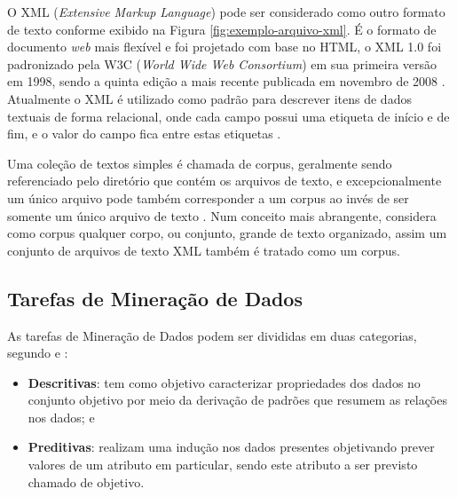         O XML (\textit{Extensive Markup Language}) pode ser considerado como outro formato de texto conforme exibido na Figura \ref{fig:exemplo-arquivo-xml}. 
        É o formato de documento \textit{web} mais flexível e foi projetado com base no HTML, o XML 1.0 foi padronizado pela W3C (\textit{World Wide Web Consortium}) em sua primeira versão em 1998, sendo a quinta edição a mais recente publicada em novembro de 2008 \cite{XML10_5ed_2008}.
        Atualmente o XML é utilizado como padrão para descrever itens de dados textuais de forma relacional, onde cada campo possui uma etiqueta de início e de fim, e o valor do campo fica entre estas etiquetas \cite[p.~6]{Jo2018TMCIBDC}.
        
        
        
        Uma coleção de textos simples é chamada de corpus, geralmente sendo referenciado pelo diretório que contém os arquivos de texto, e excepcionalmente um único arquivo pode também corresponder a um corpus ao invés de ser somente um único arquivo de texto \cite[p.~6]{Jo2018TMCIBDC}.
        Num conceito mais abrangente,  considera como corpus qualquer corpo, ou conjunto, grande de texto organizado, assim um conjunto de arquivos de texto XML também é tratado como um corpus.
    
    \subsection{Tarefas de Mineração de Dados} \label{subsec:Tarefas-de-Mineração-de-Dados}
        As tarefas de Mineração de Dados podem ser divididas em duas categorias, segundo  e : 
        \begin{itemize}
            \item \textbf{Descritivas}: tem como objetivo caracterizar propriedades dos dados no conjunto objetivo por meio da derivação de padrões que resumem as relações nos dados; e
            
            \item \textbf{Preditivas}: realizam uma indução nos dados presentes objetivando prever valores de um atributo em particular, sendo este atributo a ser previsto chamado de objetivo. 
        \end{itemize}
        
